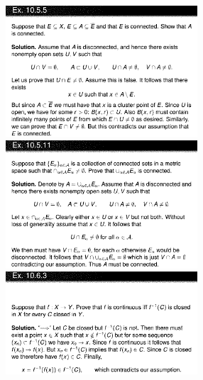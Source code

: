 \documentclass[8pt,landscape]{article}
\begin{document}
\begin{multicols}{3}
    \includegraphics[width=270]{Slides23.png} \\
    \includegraphics[width=270]{Slides24.png} \\
    \includegraphics[width=270]{Slides25.png} \\

\end{multicols}
\end{document}
